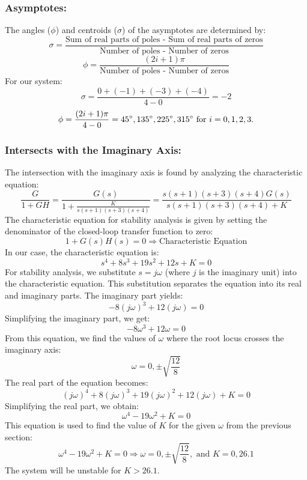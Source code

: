 \documentclass[11pt]{article}
\begin{document}
\subsubsection*{Asymptotes:}
The angles (\(\phi\)) and centroids (\(\sigma\)) of the asymptotes are determined by:
\[\sigma = \frac{\text{Sum of real parts of poles - Sum of real parts of zeros}}{\text{Number of poles - Number of zeros}}\]
\[\phi = \frac{(2i+1)\pi}{\text{Number of poles - Number of zeros}}\]
\newline
For our system:
\[\sigma = \frac{0+(-1)+(-3)+(-4)}{4-0}=-2\]
\[\phi = \frac{(2i+1)\pi}{4-0} = 45\degree, 135\degree, 225\degree, 315\degree \text{ for } i=0,1,2,3.\]

\subsubsection*{Intersects with the Imaginary Axis:}
The intersection with the imaginary axis is found by analyzing the characteristic equation:
\[\frac{G}{1+GH} = \frac{G(s)}{1+\frac{K}{s(s+1)(s+3)(s+4)}}=\frac{s(s+1)(s+3)(s+4)G(s)}{s(s+1)(s+3)(s+4)+K}\]
\newline
The characteristic equation for stability analysis is given by setting the denominator of the closed-loop transfer function to zero:
\[1 + G(s)H(s) = 0 \Rightarrow \text{Characteristic Equation}\]
\newline
In our case, the characteristic equation is:
\[s^4+8s^3+19s^2+12s+K=0\]
\newline
For stability analysis, we substitute \( s=j\omega \) (where \( j \) is the imaginary unit) into the characteristic equation. This substitution separates the equation into its real and imaginary parts.
\newline
The imaginary part yields:
\[-8(j\omega)^3 + 12(j\omega) = 0\]
Simplifying the imaginary part, we get:
\[-8\omega^3+12\omega=0\]
From this equation, we find the values of \( \omega \) where the root locus crosses the imaginary axis:
\[\omega = 0, \pm\sqrt{\frac{12}{8}}\]
\newline
The real part of the equation becomes:
\[(j\omega)^4 + 8(j\omega)^3 + 19(j\omega)^2 + 12(j\omega) + K = 0\]
Simplifying the real part, we obtain:
\[\omega^4 - 19\omega^2 + K = 0\]
\newline
This equation is used to find the value of \( K \) for the given \( \omega \) from the previous section:
\[\omega^4 - 19\omega^2 + K = 0 \Rightarrow \omega = 0, \pm\sqrt{\frac{12}{8}}, \text{ and } K = 0, 26.1\]
\newline
The system will be unstable for \( K>26.1 \).
\end{document}
